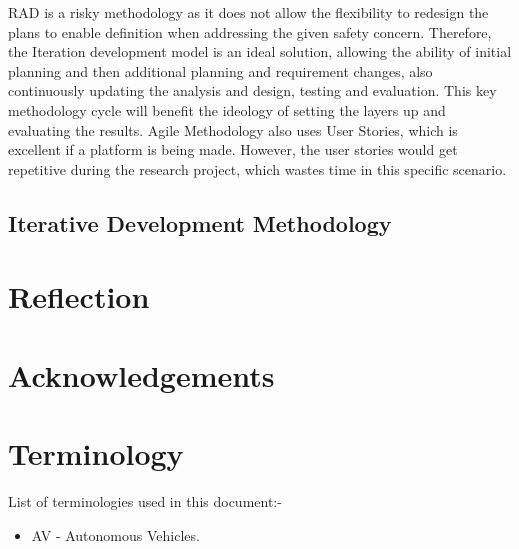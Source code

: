 \documentclass[12pt]{report} %
\begin{document}
	RAD is a risky methodology as it does not allow the flexibility to redesign the plans to enable definition when addressing the given safety concern. Therefore, the Iteration development model is an ideal solution, allowing the ability of initial planning and then additional planning and requirement changes, also continuously updating the analysis and design, testing and evaluation. This key methodology cycle will benefit the ideology of setting the layers up and evaluating the results. Agile Methodology also uses User Stories, which is excellent if a platform is being made. However, the user stories would get repetitive during the research project, which wastes time in this specific scenario.

	\section{Iterative Development Methodology}

\chapter{Reflection}

\chapter*{Acknowledgements}

\chapter*{Terminology}
List of terminologies used in this document:-
\begin{itemize}
	\item AV - Autonomous Vehicles.
\end{itemize}


\clearpage
\nocite{*}
\small{
	}


\end{document}

